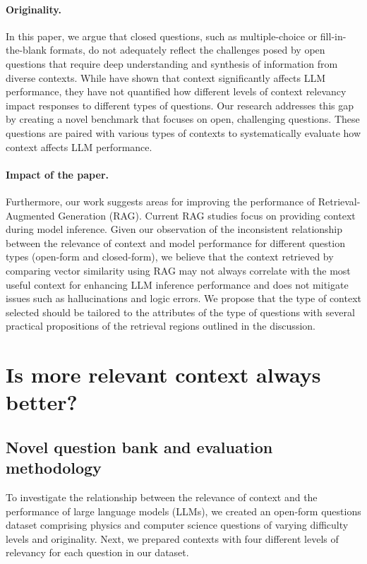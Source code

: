 \documentclass{article}
\begin{document}
    \paragraph{Originality.}
    In this paper, we argue that closed questions, such as multiple-choice or fill-in-the-blank formats, do not adequately reflect the challenges posed by open questions that require deep understanding and synthesis of information from diverse contexts. While \citet{min2022rethinking} have shown that context significantly affects LLM performance, they have not quantified how different levels of context relevancy impact responses to different types of questions. Our research addresses this gap by creating a novel benchmark that focuses on open, challenging questions. These questions are paired with various types of contexts to systematically evaluate how context affects LLM performance. 

    \paragraph{Impact of the paper.}
    Furthermore, our work suggests areas for improving the performance of Retrieval-Augmented Generation (RAG). Current RAG studies focus on providing context during model inference. Given our observation of the inconsistent relationship between the relevance of context and model performance for different question types (open-form and closed-form), we believe that the context retrieved by comparing vector similarity using RAG may not always correlate with the most useful context for enhancing LLM inference performance and does not mitigate issues such as hallucinations and logic errors. We propose that the type of context selected should be tailored to the attributes of the type of questions with several practical propositions of the retrieval regions outlined in the discussion.

\section{Is more relevant context always better?}

\subsection{Novel question bank and evaluation methodology}

    To investigate the relationship between the relevance of context and the performance of large language models (LLMs), we created an open-form questions dataset comprising physics and computer science questions of varying difficulty levels and originality. Next, we prepared contexts with four different levels of relevancy for each question in our dataset.
\end{document}

